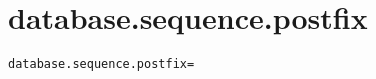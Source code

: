 \section{database.sequence.postfix}
\label{configuration:DatabaseSequencePostfix}
\ClearAPI
\TODO
{}
\begin{lstlisting}[style=Props,caption={Usage example for \textit{database.sequence.postfix}}]
database.sequence.postfix=
\end{lstlisting}
